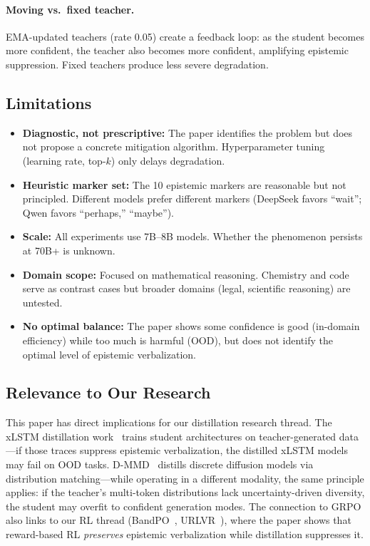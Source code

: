 \documentclass[11pt]{article}
\begin{document}
\paragraph{Moving vs.\ fixed teacher.}
EMA-updated teachers (rate 0.05) create a feedback loop: as the student becomes more confident, the teacher also becomes more confident, amplifying epistemic suppression. Fixed teachers produce less severe degradation.

\subsection{Limitations}

\begin{itemize}
    \item \textbf{Diagnostic, not prescriptive:} The paper identifies the problem but does not propose a concrete mitigation algorithm. Hyperparameter tuning (learning rate, top-$k$) only delays degradation.
    \item \textbf{Heuristic marker set:} The 10 epistemic markers are reasonable but not principled. Different models prefer different markers (DeepSeek favors ``wait''; Qwen favors ``perhaps,'' ``maybe'').
    \item \textbf{Scale:} All experiments use 7B--8B models. Whether the phenomenon persists at 70B+ is unknown.
    \item \textbf{Domain scope:} Focused on mathematical reasoning. Chemistry and code serve as contrast cases but broader domains (legal, scientific reasoning) are untested.
    \item \textbf{No optimal balance:} The paper shows some confidence is good (in-domain efficiency) while too much is harmful (OOD), but does not identify the optimal level of epistemic verbalization.
\end{itemize}

\subsection{Relevance to Our Research}

This paper has direct implications for our distillation research thread. The xLSTM distillation work~\cite{xlstm} trains student architectures on teacher-generated data---if those traces suppress epistemic verbalization, the distilled xLSTM models may fail on OOD tasks. D-MMD~\cite{dmmd} distills discrete diffusion models via distribution matching---while operating in a different modality, the same principle applies: if the teacher's multi-token distributions lack uncertainty-driven diversity, the student may overfit to confident generation modes. The connection to GRPO also links to our RL thread (BandPO~\cite{bandpo}, URLVR~\cite{urlvr}), where the paper shows that reward-based RL \textit{preserves} epistemic verbalization while distillation suppresses it.
\end{document}
